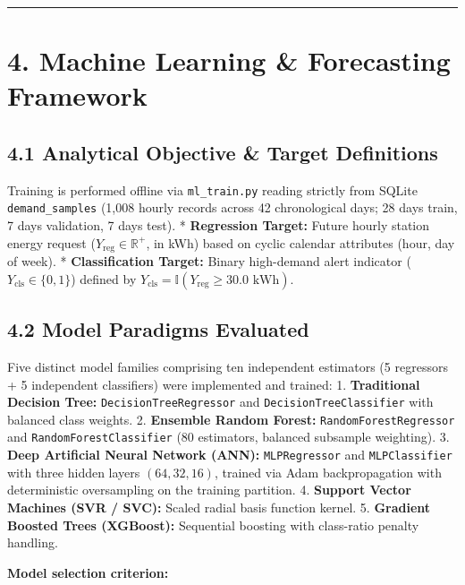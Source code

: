 \documentclass[
]{article}
\begin{document}
\vspace{0.5em}\noindent\textcolor{gridsenseblue}{\rule{\linewidth}{0.6pt}}\vspace{0.5em}

\section{4. Machine Learning \& Forecasting
Framework}\label{machine-learning-forecasting-framework}

\subsection{4.1 Analytical Objective \& Target
Definitions}\label{analytical-objective-target-definitions}

Training is performed offline via \texttt{ml\_train.py} reading strictly
from SQLite \texttt{demand\_samples} (1,008 hourly records across 42
chronological days; 28 days train, 7 days validation, 7 days test). *
\textbf{Regression Target:} Future hourly station energy request
(\(Y_{\text{reg}} \in \mathbb{R}^+\), in kWh) based on cyclic calendar
attributes (hour, day of week). * \textbf{Classification Target:} Binary
high-demand alert indicator (\(Y_{\text{cls}} \in \{0, 1\}\)) defined by
\(Y_{\text{cls}} = \mathbb{I}(Y_{\text{reg}} \ge 30.0\text{ kWh})\).

\subsection{4.2 Model Paradigms
Evaluated}\label{model-paradigms-evaluated}

Five distinct model families comprising ten independent estimators (5
regressors + 5 independent classifiers) were implemented and trained: 1.
\textbf{Traditional Decision Tree:} \texttt{DecisionTreeRegressor} and
\texttt{DecisionTreeClassifier} with balanced class weights. 2.
\textbf{Ensemble Random Forest:} \texttt{RandomForestRegressor} and
\texttt{RandomForestClassifier} (80 estimators, balanced subsample
weighting). 3. \textbf{Deep Artificial Neural Network (ANN):}
\texttt{MLPRegressor} and \texttt{MLPClassifier} with three hidden
layers \((64, 32, 16)\), trained via Adam backpropagation with
deterministic oversampling on the training partition. 4. \textbf{Support
Vector Machines (SVR / SVC):} Scaled radial basis function kernel. 5.
\textbf{Gradient Boosted Trees (XGBoost):} Sequential boosting with
class-ratio penalty handling.

\textbf{Model selection criterion:}
\end{document}
